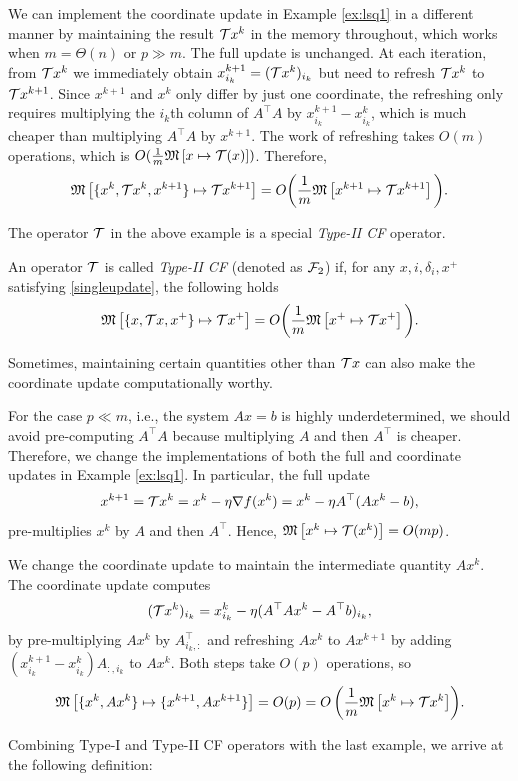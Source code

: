 \begin{example}\label{ex:lsq2}
We can implement the coordinate update in Example \ref{ex:lsq1} in a different manner by maintaining the result ${\mathcal{T}} x^k$ in the memory throughout, which works when $m=\Theta(n)$ or $p\gg m$. The full update is unchanged. 
At each iteration, from ${\mathcal{T}} x^k$ we immediately obtain $x_{i_k}^{k+1}=({\mathcal{T}} x^k )_{i_k}$ but  need to refresh ${\mathcal{T}} x^k$ to ${\mathcal{T}} x^{k+1}$.
Since $x^{k+1}$ and $x^k$ only differ by just one coordinate, the refreshing only requires multiplying the $i_k$th column of $A^\top A$ by $x^{k+1}_{i_k}-x^k_{i_k}$, which is much cheaper than multiplying $A^\top A$ by $x^{k+1}$. The work of refreshing takes $O(m)$ operations, which is $O(\frac{1}{m}\mathfrak{M}\left[{x}\mapsto {{\mathcal{T}}(x)}\right])$.
Therefore,
$$\mathfrak{M}\left[{\{ x^k,{\mathcal{T}} x^k, x^{k+1}\}}\mapsto { {\mathcal{T}}x^{k+1}}\right]= O\bigg(\frac{1}{m}  \mathfrak{M}\left[{x^{k+1}}\mapsto {{\mathcal{T}}x^{k+1}}\right] \bigg).$$
\end{example}
The operator ${\mathcal{T}}$ in the above example is a special \emph{Type-II CF} operator.

\begin{definition}[Type-II CF]
An operator ${\mathcal{T}}$ is called \emph{Type-II CF} (denoted as ${\mathcal{F}}_2$) if, for any $x,i,\delta_i,x^+$ satisfying \eqref{singleupdate}, the following holds
\begin{equation}\label{op-cuf2} \nops{\{ x,\cT x, x^+\}}{ \cT x^+}= O\bigg(\frac{1}{m}\nops{x^+}{\cT x^+}\bigg).
\end{equation}
\end{definition}
Sometimes, maintaining certain quantities other than ${\mathcal{T}} x$ can also make the coordinate update computationally worthy.
\begin{example}\label{ex:lsq3}
For the case $p\ll m$, i.e., the system $Ax=b$ is highly underdetermined, we should avoid pre-computing $A^\top A$ because multiplying $A$ and then $A^\top$ is cheaper. Therefore, we change the implementations of both the full and coordinate updates in Example \ref{ex:lsq1}. In particular, the full update
$$x^{k+1}={\mathcal{T}} x^k =x^k-\eta\nabla f(x^k)=x^k-\eta A^\top (Ax^k-b),$$
pre-multiplies $x^k$ by $A$ and then $A^\top$. Hence, 
$\mathfrak{M}\left[{x^k}\mapsto {{\mathcal{T}}(x^k)}\right]=O(mp)$.

We change the coordinate update to maintain the intermediate quantity $Ax^k$. The coordinate update computes 
$$({\mathcal{T}} x^k)_{i_k}=x^k_{i_k}-\eta (A^\top Ax^k-A^\top b)_{i_k},$$
by pre-multiplying $Ax^k$ by $A^{\top}_{i_k,:}$ and refreshing $Ax^k$ to $Ax^{k+1}$ by adding $(x^{k+1}_{i_k}-x^k_{i_k}) A_{:,i_k}$ to $A x^k$. Both steps take $O(p)$ operations, so
\begin{displaymath}{\nops{\{x^k,Ax^k\}}{\{x^{k+1},Ax^{k+1}\}}=O(p)=O\left(\frac{1}{m}\nops{x^k}{\cT x^k}\right)}.\end{displaymath}
\end{example}
Combining Type-I and Type-II CF operators with the last example, we arrive at the following definition:

